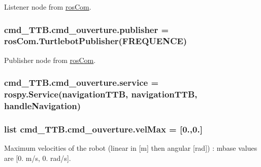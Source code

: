 Listener node from \hyperlink{namespacecmd__TTB_1_1rosCom}{ros\+Com}. 

\subsubsection[{\texorpdfstring{publisher}{publisher}}]{\setlength{\rightskip}{0pt plus 5cm}cmd\+\_\+\+T\+T\+B.\+cmd\+\_\+ouverture.\+publisher = {\bf ros\+Com.\+Turtlebot\+Publisher}({\bf F\+R\+E\+Q\+U\+E\+N\+CE})}\hypertarget{namespacecmd__TTB_1_1cmd__ouverture_a453ff2743ee8d9e0d8a9827f06ad3a4a}{}\label{namespacecmd__TTB_1_1cmd__ouverture_a453ff2743ee8d9e0d8a9827f06ad3a4a}


Publisher node from \hyperlink{namespacecmd__TTB_1_1rosCom}{ros\+Com}. 

\subsubsection[{\texorpdfstring{service}{service}}]{\setlength{\rightskip}{0pt plus 5cm}cmd\+\_\+\+T\+T\+B.\+cmd\+\_\+ouverture.\+service = rospy.\+Service(\textquotesingle{}navigation\+T\+TB\textquotesingle{}, navigation\+T\+TB, {\bf handle\+Navigation})}\hypertarget{namespacecmd__TTB_1_1cmd__ouverture_ae3d69e9c63df8aea84f2ae92f853d24f}{}\label{namespacecmd__TTB_1_1cmd__ouverture_ae3d69e9c63df8aea84f2ae92f853d24f}
\subsubsection[{\texorpdfstring{vel\+Max}{velMax}}]{\setlength{\rightskip}{0pt plus 5cm}list cmd\+\_\+\+T\+T\+B.\+cmd\+\_\+ouverture.\+vel\+Max = \mbox{[}0.,0.\mbox{]}}\hypertarget{namespacecmd__TTB_1_1cmd__ouverture_af294464cb92aea691b05f1097a4ea28d}{}\label{namespacecmd__TTB_1_1cmd__ouverture_af294464cb92aea691b05f1097a4ea28d}


Maximum velocities of the robot (linear in \mbox{[}m\mbox{]} then angular \mbox{[}rad\mbox{]}) \+: mbase values are \mbox{[}0. m/s, 0. rad/s\mbox{]}. 

